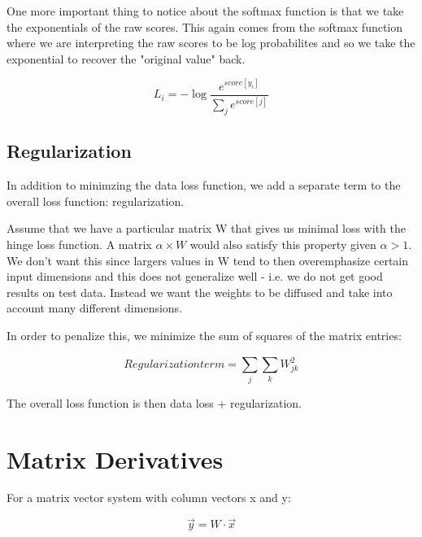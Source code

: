 \documentclass[11pt]{article}
\begin{document}
One more important thing to notice about the softmax function is that we take the exponentials of the raw scores. This
again comes from the softmax function where we are interpreting the raw scores to be log probabilites and so we 
take the exponential to recover the "original value" back. 

\begin{equation}

L_i = - \log { \frac { e ^ {score[y_i]} } {\sum_{j}^{} e ^ {score[j]} } } 

\end{equation}


\subsection{Regularization}
\label{sec:org4d581c9}

In addition to minimzing the data loss function, we add a separate term to the overall loss function: regularization. 

Assume that we have a particular matrix W that gives us minimal loss with the hinge loss function. A matrix \(\alpha \times W\)
would also satisfy this property given \(\alpha \gt 1\). We don't want this since largers values in W tend to then overemphasize
certain input dimensions and this does not generalize well - i.e. we do not get good results on test data. Instead we want the
weights to be diffused and take into account many different dimensions. 

In order to penalize this, we minimize the sum of squares of the matrix entries: 

\begin{equation}

Regularization term = \sum_{j}^{} \sum_{k}^{} W_{jk}^{2}

\end{equation}


The overall loss function is then data loss + regularization.


\section{Matrix Derivatives}
\label{sec:orgcfcda5a}

For a matrix vector system with column vectors x and y:


\begin{equation}
\vec{y} = W \cdot \vec{x}
\end{equation}
\end{document}
